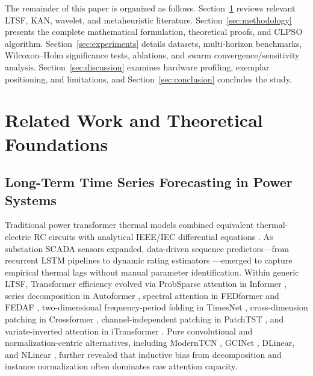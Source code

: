 \documentclass[pdflatex,sn-mathphys-num,referee,lineno]{sn-jnl}
\theoremstyle{thmstyleone}
\theoremstyle{thmstyletwo}
\theoremstyle{thmstylethree}
\begin{document}
The remainder of this paper is organized as follows. Section~\ref{sec:related_work} reviews relevant LTSF, KAN, wavelet, and metaheuristic literature. Section~\ref{sec:methodology} presents the complete mathematical formulation, theoretical proofs, and CLPSO algorithm. Section~\ref{sec:experiments} details datasets, multi-horizon benchmarks, Wilcoxon--Holm significance tests, ablations, and swarm convergence/sensitivity analysis. Section~\ref{sec:discussion} examines hardware profiling, exemplar positioning, and limitations, and Section~\ref{sec:conclusion} concludes the study.

\section{Related Work and Theoretical Foundations}\label{sec:related_work}

\subsection{Long-Term Time Series Forecasting in Power Systems}\label{subsec:rw_ltsf}
Traditional power transformer thermal models combined equivalent thermal-electric RC circuits with analytical IEEE/IEC differential equations \cite{swift2001fundamental, susa2005dynamic, tang2004simplified, radakovic2003hotspot, pradhan2003hst}. As substation SCADA sensors expanded, data-driven sequence predictors---from recurrent LSTM pipelines \cite{zhang2017prediction, tamilselvi2025waveletlstm, bezerra2024forecasting} to dynamic rating estimators \cite{alvarez2019transformer, gouda2012topoil}---emerged to capture empirical thermal lags without manual parameter identification. Within generic LTSF, Transformer efficiency evolved via ProbSparse attention in Informer \cite{zhou2021informer}, series decomposition in Autoformer \cite{wu2021autoformer}, spectral attention in FEDformer \cite{zhou2022fedformer} and FEDAF \cite{yang2024fedaf}, two-dimensional frequency-period folding in TimesNet \cite{wu2023timesnet}, cross-dimension patching in Crossformer \cite{zhang2023crossformer}, channel-independent patching in PatchTST \cite{nie2023patchtst}, and variate-inverted attention in iTransformer \cite{liu2024itransformer}. Pure convolutional and normalization-centric alternatives, including ModernTCN \cite{luo2024moderntcn}, GCINet \cite{fan2025gcinet}, DLinear, and NLinear \cite{zeng2023dlinear}, further revealed that inductive bias from decomposition and instance normalization often dominates raw attention capacity.
\end{document}

